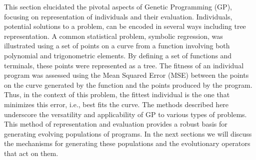   This section elucidated the pivotal aspects of Genetic Programming (GP), 
  focusing on representation of individuals and their evaluation.
  Individuals, potential solutions to a problem, can be encoded in several ways
  including tree representation.
  A common statistical problem, symbolic regression, was illustrated using a set
  of points on a curve from a function involving both polynomial and
  trigonometric elements.
  By defining a set of functions and terminals, these points were represented as
  a tree.
  The fitness of an individual program was assessed using the Mean Squared Error
  (MSE) between the points on the curve generated by the function and the points
  produced by the program.
  Thus, in the context of this problem, the fittest individual is the one that
  minimizes this error, i.e., best fits the curve.
  The methods described here underscore the versatility and applicability of GP
  to various types of problems.
  This method of representation and evaluation provides a robust basis for
  generating evolving populations of programs. 
  In the next sections we will discuss the mechanisms for generating these
  populations and the evolutionary operators that act on them.
